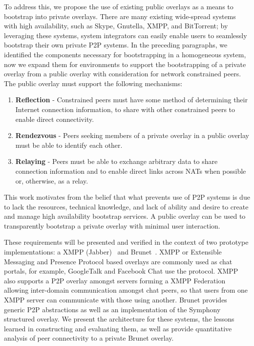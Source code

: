 \documentclass[conference]{IEEEtran}
\begin{document}
To address this, we propose the use of existing public overlays as a means to
bootstrap into private overlays.  There are many existing wide-spread systems
with high availability, such as Skype, Gnutella, XMPP, and BitTorrent; by
leveraging these systems, system integrators can easily enable users to
seamlessly bootstrap their own private P2P systems.  In the preceding
paragraphs, we identified the components necessary for bootstrapping in a
homogeneous system, now we expand them for environments to support the
bootstrapping of a private overlay from a public overlay with consideration for
network constrained peers.  The public overlay must support the following
mechanisms:
\begin{enumerate}
\item \textbf{Reflection} - Constrained peers must have some method of
determining their Internet connection information, to share with other
constrained peers to enable direct connectivity.
\item \textbf{Rendezvous} - Peers seeking members of a private overlay in a
public overlay must be able to identify each other.
\item \textbf{Relaying} - Peers must be able to exchange arbitrary data to
share connection information and to enable direct links across NATs when
possible or, otherwise, as a relay.
\end{enumerate}
This work motivates from the belief that what prevents use of P2P systems is
due to lack the resources, technical knowledge, and lack of ability and desire
to create and manage high availability bootstrap services.  A public overlay
can be used to transparently bootstrap a private overlay with minimal user
interaction.

These requirements will be presented and verified in the context of two
prototype implementations: a XMPP (Jabber)~\cite{xmpp} and
Brunet~\cite{brunet}.  XMPP or Extensible Messaging and Presence Protocol based
overlays are commonly used as chat portals, for example, GoogleTalk and
Facebook Chat use the protocol.  XMPP also supports a P2P overlay amongst
servers forming a XMPP Federation allowing inter-domain communication amongst
chat peers, so that users from one XMPP server can communicate with those using
another.  Brunet provides generic P2P abstractions as well as an implementation
of the Symphony structured overlay.  We present the architecture for these
systems, the lessons learned in constructing and evaluating them,  as well as
provide quantitative analysis of peer connectivity to a private Brunet overlay.
\end{document}
